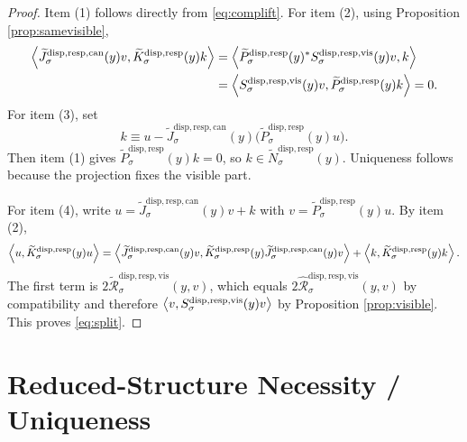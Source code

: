 \documentclass[11pt]{article}
\newcommand{\CoreForcedBodyResponse}[1]{\widehat{\mathscr R}_{#1}^{\mathrm{disp,resp,vis}}}
\newcommand{\VisibleResponseOperator}[1]{S_{#1}^{\mathrm{disp,resp,vis}}}
\newcommand{\CompatibleProjection}[1]{\widetilde P_{#1}^{\mathrm{disp,resp}}}
\newcommand{\CompatibleOperator}[1]{\widetilde K_{#1}^{\mathrm{disp,resp}}}
\newcommand{\CompatibleKernel}[1]{\widetilde N_{#1}^{\mathrm{disp,resp}}}
\newcommand{\CompatibleLift}[1]{\widetilde J_{#1}^{\mathrm{disp,resp,can}}}
\newcommand{\CompatibleResponse}[1]{\widetilde{\mathscr R}_{#1}^{\mathrm{disp,resp,vis}}}
\begin{document}
\begin{proof}
Item (1) follows directly from \eqref{eq:complift}. For item (2), using Proposition \ref{prop:samevisible},
\begin{align*}
\ev{
\CompatibleLift{\sigma}(y)v,
\CompatibleOperator{\sigma}(y)k
}
&=
\ev{
\CompatibleProjection{\sigma}(y)^*
\VisibleResponseOperator{\sigma}(y)v,
k
} \\
&=
\ev{
\VisibleResponseOperator{\sigma}(y)v,
\CompatibleProjection{\sigma}(y)k
}
=0.
\end{align*}
For item (3), set
\[
k
\equiv
u-\CompatibleLift{\sigma}(y)\bigl(\CompatibleProjection{\sigma}(y)u\bigr).
\]
Then item (1) gives \(\CompatibleProjection{\sigma}(y)k=0\), so \(k\in\CompatibleKernel{\sigma}(y)\). Uniqueness follows because the projection fixes the visible part.

For item (4), write \(u=\CompatibleLift{\sigma}(y)v+k\) with \(v=\CompatibleProjection{\sigma}(y)u\). By item (2),
\[
\ev{u,\CompatibleOperator{\sigma}(y)u}
=
\ev{
\CompatibleLift{\sigma}(y)v,
\CompatibleOperator{\sigma}(y)\CompatibleLift{\sigma}(y)v
}
+
\ev{k,\CompatibleOperator{\sigma}(y)k}.
\]
The first term is \(2\CompatibleResponse{\sigma}(y,v)\), which equals \(2\CoreForcedBodyResponse{\sigma}(y,v)\) by compatibility and therefore \(\ev{v,\VisibleResponseOperator{\sigma}(y)v}\) by Proposition \ref{prop:visible}. This proves \eqref{eq:split}.
\end{proof}

\section{Reduced-Structure Necessity / Uniqueness}
\end{document}

